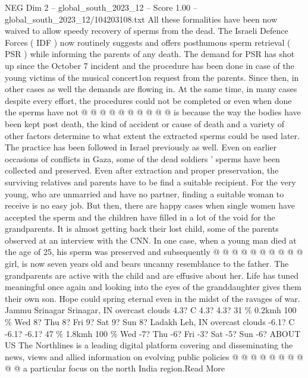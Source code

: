 \begin{textsample}{NEG Dim 2 – global\_south\_2023\_12 – Score 1.00 – global\_south\_2023\_12/104203108.txt}
All these formalities have been now waived to allow speedy recovery of sperms from the dead.
The Israeli Defence Forces ( IDF ) now routinely suggests and offers posthumous sperm retrieval ( PSR ) while informing the parents of any death.
The demand for PSR has shot up since the October 7 incident and the procedure has been done in case of the young victims of the musical concert1on request from the parents.
Since then, in other cases as well the demands are flowing in.
At the same time, in many cases despite every effort, the procedures could not be completed or even when done the sperms have not @ @ @ @ @ @ @ @ @ @ is because the way the bodies have been kept post death, the kind of accident or cause of death and a variety of other factors determine to what extent the extracted sperms could be used later.
The practice has been followed in Israel previously as well.
Even on earlier occasions of conflicts in Gaza, some of the dead soldiers ' sperms have been collected and preserved.
Even after extraction and proper preservation, the surviving relatives and parents have to be find a suitable recipient.
For the very young, who are unmarried and have no partner, finding a suitable woman to receive is no easy job.
But then, there are happy cases when single women have accepted the sperm and the children have filled in a lot of the void for the grandparents.
It is almost getting back their lost child, some of the parents observed at an interview with the CNN.
In one case, when a young man died at the age of 25, his sperm was preserved and subsequently @ @ @ @ @ @ @ @ @ @ girl, is now seven years old and bears uncanny resemblance to the father.
The grandparents are active with the child and are effusive about her.
Life has tuned meaningful once again and looking into the eyes of the granddaughter gives them their own son.
Hope could spring eternal even in the midst of the ravages of war.
Jammu Srinagar Srinagar, IN overcast clouds 4.3?
C 4.3? 4.3? 31 \% 0.2kmh 100 \% Wed 8?
Thu 8?
Fri 9?
Sat 9?
Sun 8?
Ladakh Leh, IN overcast clouds -6.1?
C -6.1? -6.1? 47 \% 1.8kmh 100 \% Wed -7?
Thu -6?
Fri -3?
Sat -5?
Sun -6?
ABOUT US The Northlines is a leading digital platform covering and disseminating the news, views and allied information on evolving public policies @ @ @ @ @ @ @ @ @ @ a particular focus on the north India region.Read More

\end{textsample}
